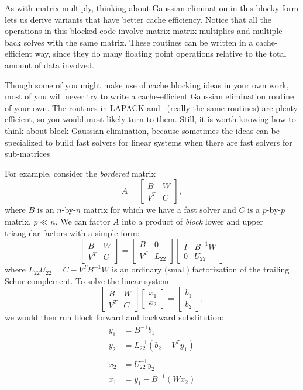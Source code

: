 \documentclass[12pt, leqno]{article} %
\begin{document}
As with matrix multiply, thinking about Gaussian elimination in this
blocky form lets us derive variants that have better cache efficiency.
Notice that all the operations in this blocked code involve matrix-matrix
multiplies and multiple back solves with the same matrix.  These routines
can be written in a cache-efficient way, since they do many floating point
operations relative to the total amount of data involved.

Though some of you might make use of cache blocking ideas in your own
work, most of you will never try to write a cache-efficient Gaussian
elimination routine of your own.  The routines in LAPACK and \matlab\
(really the same routines) are plenty efficient, so you would most
likely turn to them.  Still, it is worth knowing how to think about
block Gaussian elimination, because sometimes the ideas can be specialized
to build fast solvers for linear systems when there are fast solvers for
sub-matrices

For example, consider the {\em bordered} matrix
\[
  A = \begin{bmatrix} B & W \\ V^T & C \end{bmatrix},
\]
where $B$ is an $n$-by-$n$ matrix for which we have a fast
solver and $C$ is a $p$-by-$p$ matrix, $p \ll n$.
We can factor $A$ into a product of {\em block} lower and
upper triangular factors with a simple form:
\[
  \begin{bmatrix} B & W \\ V^T & C \end{bmatrix} =
  \begin{bmatrix} B   & 0 \\ V^T & L_{22} \end{bmatrix}
  \begin{bmatrix} I & B^{-1} W \\ 0 & U_{22} \end{bmatrix}
\]
where $L_{22} U_{22} = C-V^T B^{-1} W$ is an ordinary (small) factorization
of the trailing Schur complement.  To solve the linear system
\[
  \begin{bmatrix} B & W \\ V^T & C \end{bmatrix}
  \begin{bmatrix} x_1 \\ x_2 \end{bmatrix} =
  \begin{bmatrix} b_1 \\ b_2 \end{bmatrix},
\]
we would then run block forward and backward substitution:
\begin{align*}
  y_1 &= B^{-1} b_1 \\
  y_2 &= L_{22}^{-1} \left( b_2 - V^T y_1 \right) \\
\\
  x_2 &= U_{22}^{-1} y_2 \\
  x_1 &= y_1-B^{-1} (W x_2)
\end{align*}
\end{document}

